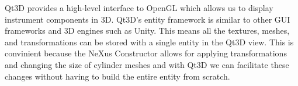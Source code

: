 Qt3D provides a high-level interface to OpenGL which allows us to display instrument components in 3D. Qt3D's entity framework is similar to other GUI frameworks and 3D engines such as Unity. This means all the textures, meshes, and transformations can be stored with a single entity in the Qt3D view. This is convinient because the NeXus Constructor allows for applying transformations and changing the size of cylinder meshes and with Qt3D we can facilitate these changes without having to build the entire entity from scratch. 
\bigskip

\bigskip
